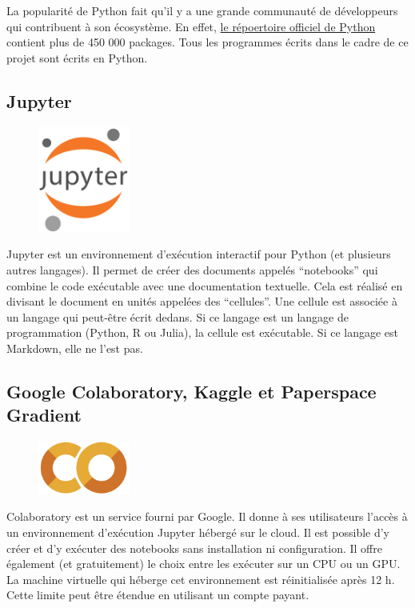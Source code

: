 La popularité de Python fait qu'il y a une grande communauté de développeurs qui contribuent à son écosystème.
En effet, \href{https://pypi.or}{le répoertoire officiel de Python} contient plus de 450 000 packages.
Tous les programmes écrits dans le cadre de ce projet sont écrits en Python.

\subsection{Jupyter}
\label{subsec.jupyter}

\begin{figure}
    \vspace*{-\topsep}
    \begin{flushright}
        \includegraphics[width=3cm]{assets/images/jupyter.png}
    \end{flushright}
\end{figure}
Jupyter est un environnement d'exécution interactif pour Python (et plusieurs autres langages).
Il permet de créer des documents appelés ``notebooks'' qui combine le code exécutable avec une documentation textuelle.
Cela est réalisé en divisant le document en unités appelées des ``cellules''.
Une cellule est associée à un langage qui peut-être écrit dedans.
Si ce langage est un langage de programmation (Python, R ou Julia), la cellule est exécutable.
Si ce langage est Markdown, elle ne l'est pas.


\subsection{Google Colaboratory, Kaggle et Paperspace Gradient}
\label{subsec.colab}

\begin{figure}
    \vspace*{-\topsep}
    \begin{flushright}
        \includegraphics[width=3cm]{assets/images/colab.png}
    \end{flushright}
\end{figure}
Colaboratory est un service fourni par Google.
Il donne à ses utilisateurs l'accès à un environnement d'exécution Jupyter hébergé sur le cloud.
Il est possible d'y créer et d'y exécuter des notebooks sans installation ni configuration.
Il offre également (et gratuitement) le choix entre les exécuter sur un CPU ou un GPU.
La machine virtuelle qui héberge cet environnement est réinitialisée après 12 h.
Cette limite peut être étendue en utilisant un compte payant.

